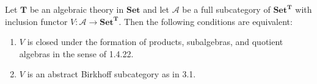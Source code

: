 Let $\mathbf{T}$ be an algebraic theory in $\mathbf{Set}$ and let $\mathcal{A}$ be a full subcategory of $\mathbf{Set}^{\mathbf{T}}$ with inclusion functor $V : \mathcal{A} \longrightarrow \mathbf{Set}^{\mathbf{T}}$. Then the following conditions are equivalent:

\begin{enumerate}
\item $V$ is closed under the formation of products, subalgebras, and quotient algebras in the sense of 1.4.22.
\item $V$ is an abstract Birkhoff subcategory as in 3.1.
\end{enumerate}
